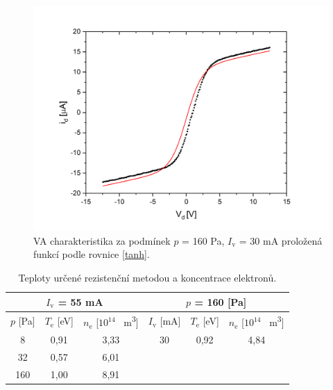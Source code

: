 \documentclass[a4paper,12pt]{article}
\begin{document}
\begin{figure}[h!]
	\centering
	\includegraphics[width=130mm]{tanh4.png}
	\caption{VA charakteristika za podmínek $p$ = 160 \si{\pascal}, $I_\text{{v}}$ = 30 \si{\milli\ampere} proložená funkcí podle rovnice \eqref{tanh}.}
	\label{tanh4}
\end{figure}

\newpage
\begin{center}
	\begin{table}[h!]
		\centering
		\caption{Teploty určené rezistenční metodou a koncentrace elektronů.}
		\label{tab1}
		\begin{tabular}{|c|c|c|c|c|c|} \hline
			\multicolumn{3}{|c|}{$I_\text{v}$ = 55 \si{\milli\ampere}}& \multicolumn{3}{c|}{$p$ = 160 [\si{\pascal}] }  \\ \hline
			$p$ [\si{\pascal}] & $T_\text{e}$ [\si{\electronvolt}]  & $n_\text{e}$ [$10^{14}$ \si{\per\meter\cubed}]& $I_\text{v}$ [\si{\milli\ampere}] & $T_\text{e}$ [\si{\electronvolt}] & $n_\text{e}$  [$  10^{14}$ \si{\per\meter\cubed}]\\ \hline
			8 & 0,91 & 3,33 & 30 & 0,92 & 4,84\\ \hline
			32 & 0,57 & 6,01 &  &  &  \\ \hline
			160 & 1,00 & 8,91 &  &  &  \\ \hline
			
		\end{tabular}
	\end{table}
\end{center}
\end{document}
